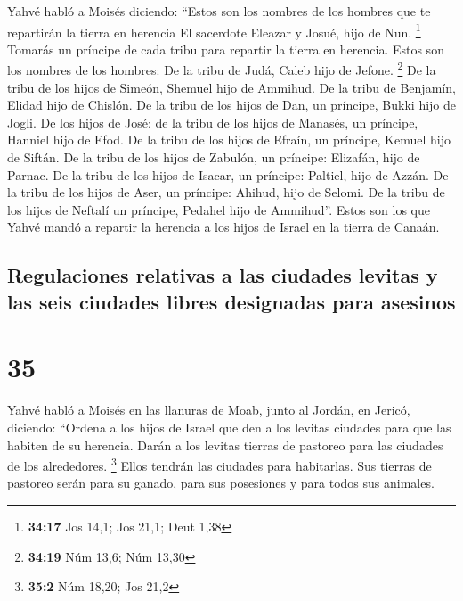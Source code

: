  Yahvé habló a Moisés diciendo:  ``Estos
son los nombres de los hombres que te repartirán la tierra en herencia
El sacerdote Eleazar y Josué, hijo de Nun. \footnote{\textbf{34:17} Jos
  14,1; Jos 21,1; Deut 1,38}  Tomarás un príncipe de cada
tribu para repartir la tierra en herencia.  Estos son los
nombres de los hombres: De la tribu de Judá, Caleb hijo de Jefone.
\footnote{\textbf{34:19} Núm 13,6; Núm 13,30}  De la
tribu de los hijos de Simeón, Shemuel hijo de Ammihud. 
De la tribu de Benjamín, Elidad hijo de Chislón.  De la
tribu de los hijos de Dan, un príncipe, Bukki hijo de Jogli.
 De los hijos de José: de la tribu de los hijos de
Manasés, un príncipe, Hanniel hijo de Efod.  De la tribu
de los hijos de Efraín, un príncipe, Kemuel hijo de Siftán.
 De la tribu de los hijos de Zabulón, un príncipe:
Elizafán, hijo de Parnac.  De la tribu de los hijos de
Isacar, un príncipe: Paltiel, hijo de Azzán.  De la tribu
de los hijos de Aser, un príncipe: Ahihud, hijo de Selomi.
 De la tribu de los hijos de Neftalí un príncipe, Pedahel
hijo de Ammihud''.  Estos son los que Yahvé mandó a
repartir la herencia a los hijos de Israel en la tierra de Canaán.

\hypertarget{regulaciones-relativas-a-las-ciudades-levitas-y-las-seis-ciudades-libres-designadas-para-asesinos}{%
\subsection{Regulaciones relativas a las ciudades levitas y las seis
ciudades libres designadas para
asesinos}\label{regulaciones-relativas-a-las-ciudades-levitas-y-las-seis-ciudades-libres-designadas-para-asesinos}}

\hypertarget{section-34}{%
\section{35}\label{section-34}}

 Yahvé habló a Moisés en las llanuras de Moab, junto al
Jordán, en Jericó, diciendo:  ``Ordena a los hijos de
Israel que den a los levitas ciudades para que las habiten de su
herencia. Darán a los levitas tierras de pastoreo para las ciudades de
los alrededores. \footnote{\textbf{35:2} Núm 18,20; Jos 21,2}
 Ellos tendrán las ciudades para habitarlas. Sus tierras
de pastoreo serán para su ganado, para sus posesiones y para todos sus
animales.

